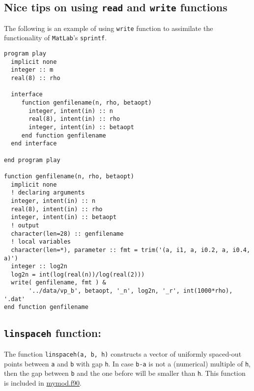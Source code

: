 \documentclass[11pt]{article}
\begin{document}
\subsection{Nice tips on using \texttt{read} and \texttt{write} functions}
\label{sec:org014bb6d}

The following is an example of using \texttt{write} function to assimilate the functionality of \texttt{MatLab}'s \texttt{sprintf}.

\begin{verbatim}
program play
  implicit none
  integer :: m
  real(8) :: rho

  interface
     function genfilename(n, rho, betaopt)
       integer, intent(in) :: n
       real(8), intent(in) :: rho
       integer, intent(in) :: betaopt
     end function genfilename
  end interface

end program play

function genfilename(n, rho, betaopt)
  implicit none
  ! declaring arguments
  integer, intent(in) :: n
  real(8), intent(in) :: rho
  integer, intent(in) :: betaopt
  ! output
  character(len=28) :: genfilename
  ! local variables
  character(len=*), parameter :: fmt = trim('(a, i1, a, i0.2, a, i0.4, a)')
  integer :: log2n
  log2n = int(log(real(n))/log(real(2)))
  write( genfilename, fmt ) &
       '../data/vp_b', betaopt, '_n', log2n, '_r', int(1000*rho), '.dat'
end function genfilename
\end{verbatim}

\subsection{\texttt{linspaceh} function:}
\label{sec:orgf4426f7}
The function \texttt{linspaceh(a, b, h)} constructs a vector of uniformly spaced-out points between \texttt{a} and \texttt{b} with gap \texttt{h}. In case \texttt{b-a} is not a (numerical) multiple of \texttt{h}, then the gap between \texttt{b} and the one before will be smaller than \texttt{h}. This function is included in \href{file:///Users/tae/Google\%20Drive/VP\_fortran/src/mymod.f90}{mymod.f90}.
\end{document}
